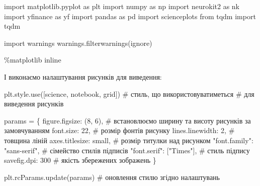 \documentclass[
  letterpaper,
]{report}
\newenvironment{Shaded}{\begin{snugshade}}{\end{snugshade}}
\newcommand{\CommentTok}[1]{\textcolor[rgb]{0.37,0.37,0.37}{#1}}
\newcommand{\DecValTok}[1]{\textcolor[rgb]{0.68,0.00,0.00}{#1}}
\newcommand{\ImportTok}[1]{\textcolor[rgb]{0.00,0.46,0.62}{#1}}
\newcommand{\NormalTok}[1]{\textcolor[rgb]{0.00,0.23,0.31}{#1}}
\newcommand{\OperatorTok}[1]{\textcolor[rgb]{0.37,0.37,0.37}{#1}}
\newcommand{\StringTok}[1]{\textcolor[rgb]{0.13,0.47,0.30}{#1}}
\begin{document}
\begin{Shaded}
\begin{Highlighting}[]
\ImportTok{import}\NormalTok{ matplotlib.pyplot }\ImportTok{as}\NormalTok{ plt }
\ImportTok{import}\NormalTok{ numpy }\ImportTok{as}\NormalTok{ np}
\ImportTok{import}\NormalTok{ neurokit2 }\ImportTok{as}\NormalTok{ nk}
\ImportTok{import}\NormalTok{ yfinance }\ImportTok{as}\NormalTok{ yf}
\ImportTok{import}\NormalTok{ pandas }\ImportTok{as}\NormalTok{ pd}
\ImportTok{import}\NormalTok{ scienceplots}
\ImportTok{from}\NormalTok{ tqdm }\ImportTok{import}\NormalTok{ tqdm}

\ImportTok{import}\NormalTok{ warnings}
\NormalTok{warnings.filterwarnings(}\StringTok{\textquotesingle{}ignore\textquotesingle{}}\NormalTok{)}

\OperatorTok{\%}\NormalTok{matplotlib inline}
\end{Highlighting}
\end{Shaded}

І виконаємо налаштування рисунків для виведення:

\begin{Shaded}
\begin{Highlighting}[]
\NormalTok{plt.style.use([}\StringTok{\textquotesingle{}science\textquotesingle{}}\NormalTok{, }\StringTok{\textquotesingle{}notebook\textquotesingle{}}\NormalTok{, }\StringTok{\textquotesingle{}grid\textquotesingle{}}\NormalTok{]) }\CommentTok{\# стиль, що використовуватиметься}
                                               \CommentTok{\# для виведення рисунків}

\NormalTok{params }\OperatorTok{=}\NormalTok{ \{}
    \StringTok{\textquotesingle{}figure.figsize\textquotesingle{}}\NormalTok{: (}\DecValTok{8}\NormalTok{, }\DecValTok{6}\NormalTok{),         }\CommentTok{\# встановлюємо ширину та висоту рисунків за замовчуванням}
    \StringTok{\textquotesingle{}font.size\textquotesingle{}}\NormalTok{: }\DecValTok{22}\NormalTok{,                  }\CommentTok{\# розмір фонтів рисунку}
    \StringTok{\textquotesingle{}lines.linewidth\textquotesingle{}}\NormalTok{: }\DecValTok{2}\NormalTok{,             }\CommentTok{\# товщина ліній}
    \StringTok{\textquotesingle{}axes.titlesize\textquotesingle{}}\NormalTok{: }\StringTok{\textquotesingle{}small\textquotesingle{}}\NormalTok{,        }\CommentTok{\# розмір титулки над рисунком}
    \StringTok{"font.family"}\NormalTok{: }\StringTok{"sans{-}serif"}\NormalTok{,      }\CommentTok{\# сімейство стилів підписів }
    \StringTok{"font.serif"}\NormalTok{: [}\StringTok{"Times"}\NormalTok{],          }\CommentTok{\# стиль підпису}
    \StringTok{\textquotesingle{}savefig.dpi\textquotesingle{}}\NormalTok{: }\DecValTok{300}                \CommentTok{\# якість збережених зображень}
\NormalTok{\}}

\NormalTok{plt.rcParams.update(params)           }\CommentTok{\# оновлення стилю згідно налаштувань}
\end{Highlighting}
\end{Shaded}
\end{document}
